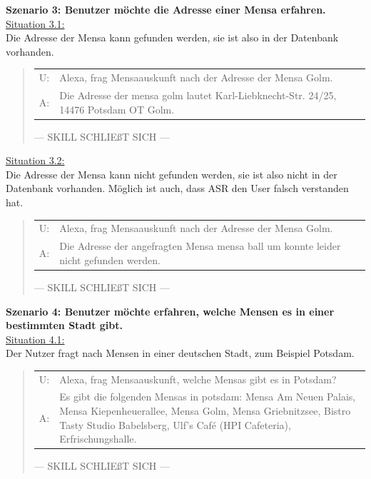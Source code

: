 \documentclass[12pt]{article}
\begin{document}
\textbf{Szenario 3: Benutzer möchte die Adresse einer Mensa erfahren.}\\
\ul{Situation 3.1:}\\Die Adresse der Mensa kann gefunden werden, sie ist also in der Datenbank vorhanden.
\begin{quote}
\begin{tabular}{lp{12cm}}
	U:& Alexa, frag Mensaauskunft nach der Adresse der Mensa Golm.\\
	A:& Die Adresse der mensa golm lautet Karl-Liebknecht-Str. 24/25, 14476 Potsdam OT Golm.\\[0.2cm]
\end{tabular}
--- SKILL SCHLIEßT SICH ---\\
\end{quote}

\ul{Situation 3.2:}\\Die Adresse der Mensa kann nicht gefunden werden, sie ist also nicht in der Datenbank vorhanden. Möglich ist auch, dass ASR den User falsch verstanden hat.
\begin{quote}
\begin{tabular}{lp{12cm}}
	U:& Alexa, frag Mensaauskunft nach der Adresse der Mensa Golm.\\
	A:& Die Adresse der angefragten Mensa mensa ball um konnte leider nicht gefunden werden.\\[0.2cm]	
\end{tabular}
--- SKILL SCHLIEßT SICH ---\\
\end{quote}

\textbf{Szenario 4: Benutzer möchte erfahren, welche Mensen es in einer bestimmten Stadt gibt.}\\
\ul{Situation 4.1:}\\Der Nutzer fragt nach Mensen in einer deutschen Stadt, zum Beispiel Potsdam.
\begin{quote}
\begin{tabular}{lp{12cm}}
	U:& Alexa, frag Mensaauskunft, welche Mensas gibt es in Potsdam?\\
	A:& Es gibt die folgenden Mensas in potsdam: Mensa Am Neuen Palais, Mensa Kiepenheuerallee, Mensa Golm, Mensa Griebnitzsee, Bistro Tasty Studio Babelsberg, Ulf's Café (HPI Cafeteria), Erfrischungshalle.\\[0.2cm]
\end{tabular}
--- SKILL SCHLIEßT SICH ---\\
\end{quote}
\end{document}
